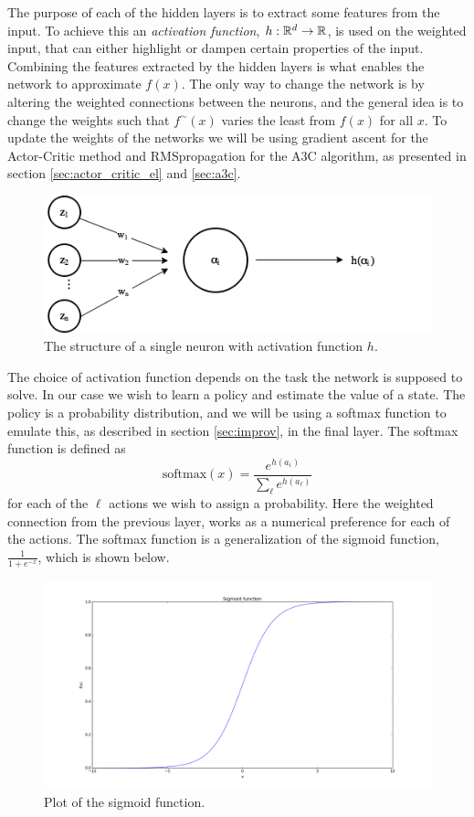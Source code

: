 \documentclass[11pt]{article}
\begin{document}
The purpose of each of the hidden layers is to extract some features from the input.
To achieve this an \textit{activation function}, $h: \mathbb{R}^d \to \mathbb{R}$, is used on the weighted
input, that can either highlight or dampen
certain properties of the input.
Combining the features extracted by the hidden layers is what enables the network
to approximate $f(x)$.
The only way to change the network is by altering the weighted connections
between the neurons, and the general idea is to change the weights such that
$f^\sim(x)$ varies the least from $f(x)$ for all $x$.
To update the weights of the networks we will be using gradient ascent
for the Actor-Critic method and RMSpropagation for the A3C algorithm,
as presented in section \ref{sec:actor_critic_el} and \ref{sec:a3c}.
\begin{figure}[!h]
    \centering
    \includegraphics[width=12cm]{include/neuron.png}
    \caption{The structure of a single neuron with activation function $h$.}
    \label{fig:neuron}
\end{figure}

The choice of activation function depends on the task the
network is supposed to solve.
In our case we wish to learn a policy and estimate the value of a state.
The policy is a probability distribution, and we will be using a softmax function
to emulate this, as described in section \ref{sec:improv}, in the final layer.
The softmax function is defined as
\begin{equation}
    \text{softmax}(x) = \frac{e^{h(a_i)}}{\sum\limits_{\ell} e^{h(a_\ell)}}
\end{equation}
for each of the $\ell$ actions we wish to assign a probability.
Here the weighted connection from the previous layer, works as
a numerical preference for each of the actions.
The softmax function is a generalization of the sigmoid function, $\frac{1}{1 + e^{-x}}$,
which is shown below.
\begin{figure}[!h]
    \centering
    \includegraphics[width=15cm]{include/sigmoid.png}
    \caption{Plot of the sigmoid function.}
    \label{fig:softmax}
\end{figure}
\end{document}
